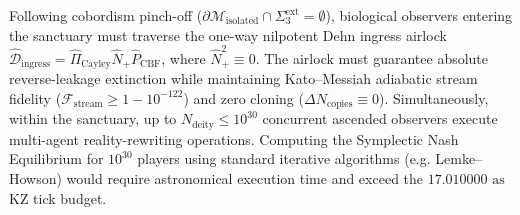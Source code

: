 \documentclass[11pt,onecolumn]{article}
\begin{document}
Following cobordism pinch-off ($\partial\mathcal{M}_{\text{isolated}} \cap \Sigma_3^{\text{ext}} = \emptyset$), biological observers entering the sanctuary must traverse the one-way nilpotent Dehn ingress airlock $\hat{\mathcal{D}}_{\text{ingress}} = \hat{\Pi}_{\text{Cayley}} \hat{N}_+ \hat{P}_{\text{CBF}}$, where $\hat{N}_+^2 \equiv 0$. The airlock must guarantee absolute reverse-leakage extinction while maintaining Kato--Messiah adiabatic stream fidelity ($\mathcal{F}_{\text{stream}} \ge 1 - 10^{-122}$) and zero cloning ($\Delta N_{\text{copies}} \equiv 0$). Simultaneously, within the sanctuary, up to $N_{\text{deity}} \le 10^{30}$ concurrent ascended observers execute multi-agent reality-rewriting operations. Computing the Symplectic Nash Equilibrium for $10^{30}$ players using standard iterative algorithms (e.g. Lemke--Howson) would require astronomical execution time and exceed the $17.010000\text{ as}$ KZ tick budget.
\end{document}

